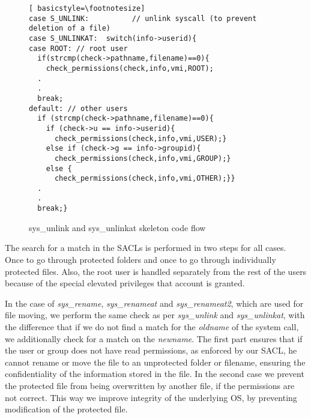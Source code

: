 \begin{figure}[ht]
\centering
\begin{lstlisting}[ basicstyle=\footnotesize]
case S_UNLINK:          // unlink syscall (to prevent deletion of a file)
case S_UNLINKAT:  switch(info->userid){
case ROOT: // root user
  if(strcmp(check->pathname,filename)==0){
	check_permissions(check,info,vmi,ROOT);			
  .
  .
  break;
default: // other users
  if (strcmp(check->pathname,filename)==0){
	if (check->u == info->userid){
	  check_permissions(check,info,vmi,USER);}
	else if (check->g == info->groupid){
	  check_permissions(check,info,vmi,GROUP);}
	else {
	  check_permissions(check,info,vmi,OTHER);}}
  .
  .
  break;}
\end{lstlisting}
\caption{sys\_unlink and sys\_unlinkat skeleton code flow}
\label{fig:unlink}
\end{figure}

\par The search for a match in the \ac{SACL}s is performed in two steps for all cases. Once to go through protected folders and once to go through individually protected files. Also, the root user is handled separately from the rest of the users because of the special elevated privileges that account is granted. 

\par In the case of \textit{sys\_rename}, \textit{sys\_renameat} and \textit{sys\_renameat2}, which are used for file moving, we perform the same check as per \textit{sys\_unlink} and \textit{sys\_unlinkat}, with the difference that if we do not find a match for the \textit{oldname} of the system call, we additionally check for a match on the \textit{newname}. The first part ensures that if the user or group does not have read permissions, as enforced by our \ac{SACL}, he cannot rename or move the file to an unprotected folder or filename, ensuring the confidentiality of the information stored in the file. In the second case we prevent the protected file from being overwritten by another file, if the permissions are not correct. This way we improve integrity of the underlying \ac{OS}, by preventing modification of the protected file. 

